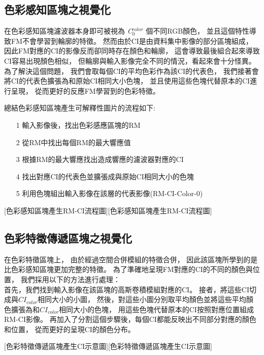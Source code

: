 \documentclass[class=NCU_thesis, crop=false]{standalone}
\begin{document}
	\pagebreak
	\subsection{色彩感知區塊之視覺化}
	在色彩感知區塊濾波器本身即可被視為 \textit{C}$^{color}_{0}$ 個不同RGB顏色，
	並且這個特性導致FM不會學習到輪廓的特徵。
	然而由於CI是由資料集中影像的部分區塊組成，
	因此FM對應的CI的影像反而卻同時存在顏色和輪廓，
	這會導致最後組合起來導致CI容易出現顏色相似，
	但輪廓與輸入影像完全不同的情況，看起來會十分怪異。
	為了解決這個問題，
	我們會取每個CI的平均色彩作為該CI的代表色，
	我們接著會將CI的代表色擴張為和原始CI相同大小色塊，
	並且使用這些色塊代替原本的CI進行呈現，
	從而更好的反應FM學習到的色彩特徵。

	總結色彩感知區塊產生可解釋性圖片的流程如下:
	\begin{itemize}
		\item [1]
		輸入影像後，找出色彩感應區塊的RM
		\item [2]
		從RM中找出每個RM的最大響應值
		\item [3]
		根據RM的最大響應找出造成響應的濾波器對應的CI
		\item [4]
		找出對應CI的代表色並擴張成與原始CI相同大小的色塊
		\item [5]
		利用色塊組出輸入影像在該層的代表影像(RM-CI-Color-0)
	\end{itemize}

	[色彩感知區塊產生RM-CI流程圖][色彩感知區塊產生RM-CI流程圖]

	\pagebreak

	\subsection{色彩特徵傳遞區塊之視覺化}
	在色彩特徵區塊上，
	由於經過空間合併模組的特徵合併，
	因此該區塊所學到的是比色彩感知區塊更加完整的特徵。
	為了準確地呈現FM對應的CI的不同的顏色與位置，
	我們採用以下的方法進行處理：\\
	首先，我們找到輸入影像在該區塊的高斯卷積模組對應的CI。
	接者，將這些CI切成與$CI_{color}$相同大小的小圖，
	然後，對這些小圖分別取平均顏色並將這些平均顏色擴張為和$CI_{color}$相同大小的色塊，
	用這些色塊代替原本的CI按照對應位置組成RM-CI影像。
	再加入了分割這個步驟後，每個CI都能反映出不同部分對應的顏色和位置，
	從而更好的呈現CI的顏色分布。

	[色彩特徵傳遞區塊產生CI示意圖][色彩特徵傳遞區塊產生CI示意圖]
\end{document}
